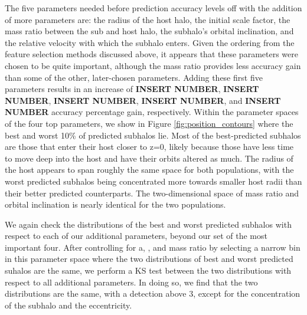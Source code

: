 \documentclass[fleqn,usenatbib]{mnras}
\newcommand\edits[1]{{\color{red}#1}}
\begin{document}
The five parameters needed before prediction accuracy levels off with the addition of more parameters are: the radius of the host halo, the initial scale factor, the mass ratio between the sub and host halo, the subhalo's orbital inclination, and the relative velocity with which the subhalo enters. Given the ordering from the feature selection methods discussed above, it appears that these parameters were chosen to be quite important, although the mass ratio provides less accuracy gain than some of the other, later-chosen parameters. Adding these first five parameters results in an increase of \edits{\textbf{INSERT NUMBER}}, \edits{\textbf{INSERT NUMBER}}, \edits{\textbf{INSERT NUMBER}}, \edits{\textbf{INSERT NUMBER}}, and  \edits{\textbf{INSERT NUMBER}} accuracy percentage gain, respectively. Within the parameter spaces of the four top parameters, we show in Figure \ref{fig:position_contours} where the best and worst 10\% of predicted subhalos lie. Most of the best-predicted subhalos are those that enter their host closer to z=0, likely because those have less time to move deep into the host and have their orbits altered as much. The radius of the host appears to span roughly the same space for both populations, with the worst predicted subhalos being concentrated more towards smaller host radii than their better predicted counterparts. The two-dimensional space of mass ratio and orbital inclination is nearly identical for the two populations.

We again check the distributions of the best and worst predicted subhalos with respect to each of our additional parameters, beyond our set of the most important four. After controlling for a, \texttheta, and mass ratio by selecting a narrow bin in this parameter space where the two distributions of best and worst predicted suhalos are the same, we perform a KS test between the two distributions with respect to all additional parameters. In doing so, we find that the two distributions are the same, with a detection above 3\textsigma, except for the concentration of the subhalo and the eccentricity.
\end{document}
